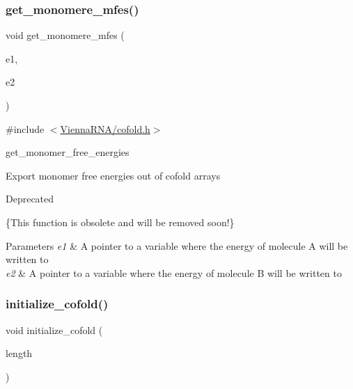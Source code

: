 \subsubsection{\texorpdfstring{get\+\_\+monomere\+\_\+mfes()}{get\_monomere\_mfes()}}
{\footnotesize\ttfamily void get\+\_\+monomere\+\_\+mfes (\begin{DoxyParamCaption}\item[{float $\ast$}]{e1,  }\item[{float $\ast$}]{e2 }\end{DoxyParamCaption})}



{\ttfamily \#include $<$\mbox{\hyperlink{cofold_8h}{Vienna\+R\+N\+A/cofold.\+h}}$>$}



get\+\_\+monomer\+\_\+free\+\_\+energies 

Export monomer free energies out of cofold arrays \begin{DoxyRefDesc}{Deprecated}
\item[\mbox{\hyperlink{deprecated__deprecated000037}{Deprecated}}]\{This function is obsolete and will be removed soon!\}\end{DoxyRefDesc}



\begin{DoxyParams}{Parameters}
{\em e1} & A pointer to a variable where the energy of molecule A will be written to \\
\hline
{\em e2} & A pointer to a variable where the energy of molecule B will be written to \\
\hline
\end{DoxyParams}
\mbox{\label{group__mfe__cofold_gafee0c32208aa2ac97338b6e3fbad7fa5}} 
\subsubsection{\texorpdfstring{initialize\+\_\+cofold()}{initialize\_cofold()}}
{\footnotesize\ttfamily void initialize\+\_\+cofold (\begin{DoxyParamCaption}\item[{int}]{length }\end{DoxyParamCaption})}



